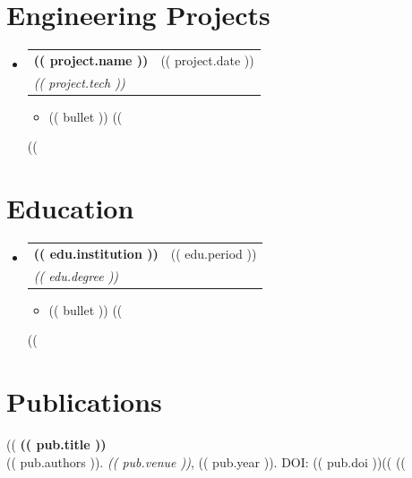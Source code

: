 \documentclass[11pt, letterpaper]{article}
\makeatletter
\newcommand{\resumeItem}[1]{\item \small{#1 \vspace{-2pt}}}
\newcommand{\resumeSubheading}[4]{
  \vspace{3pt}\item
    \begin{tabular*}{0.98\textwidth}[t]{l@{\extracolsep{\fill}}r}
      \textbf{#1} & #2 \\
      \textit{#3} & \textit{\small #4} \\
    \end{tabular*}\vspace{-5pt}
}
\makeatother
\begin{document}
\section{Engineering Projects}
\begin{itemize}[leftmargin=0in, label={}]
    ((%
    \resumeSubheading
      {(( project.name ))}{(( project.date ))}
      {(( project.tech ))}{}
      \begin{itemize}
        ((%
        \resumeItem{(( bullet ))}
        ((%
      \end{itemize}
    ((%
\end{itemize}

\section{Education}
\begin{itemize}[leftmargin=0in, label={}]
    ((%
    \resumeSubheading
      {(( edu.institution ))}{(( edu.period ))}
      {(( edu.degree ))}{}
      \begin{itemize}
        ((%
        \resumeItem{(( bullet ))}
        ((%
      \end{itemize}
    ((%
\end{itemize}

\section{Publications}
\vspace{2pt}
\small{
((%
\textbf{(( pub.title ))} \\
(( pub.authors )). \textit{(( pub.venue ))}, (( pub.year )). DOI: (( pub.doi ))((%
((%
}
\end{document}
